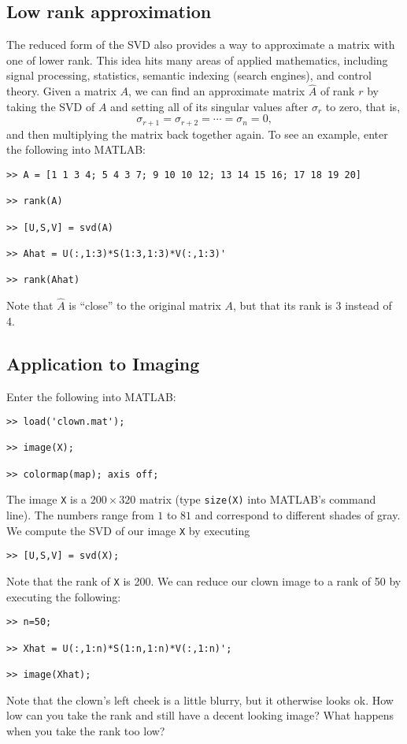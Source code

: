 \subsection{Low rank approximation}

The reduced form of the SVD also provides a way to approximate a
matrix with one of lower rank. This idea hits many areas of applied
mathematics, including signal processing, statistics, semantic
indexing (search engines), and control theory.  Given a matrix $A$,
we can find an approximate matrix $\widehat A$ of rank $r$ by taking
the SVD of $A$ and setting all of its singular values after
$\sigma_r$ to zero, that is,
\[
\sigma_{r+1} = \sigma_{r+2} = \cdots = \sigma_n = 0,
\]
and then multiplying the matrix back together again.  To see an
example, enter the following into MATLAB:

\begin{verbatim}
>> A = [1 1 3 4; 5 4 3 7; 9 10 10 12; 13 14 15 16; 17 18 19 20]

>> rank(A)

>> [U,S,V] = svd(A)

>> Ahat = U(:,1:3)*S(1:3,1:3)*V(:,1:3)'

>> rank(Ahat)
\end{verbatim}
Note that $\widehat A$ is ``close'' to the original matrix $A$, but
that its rank is 3 instead of 4.

\subsection{Application to Imaging}

Enter the following into MATLAB:
\begin{verbatim}
>> load('clown.mat');

>> image(X);

>> colormap(map); axis off;
\end{verbatim}
The image {\tt X} is a $200\times 320$ matrix (type {\tt size(X)}
into MATLAB's command line).  The numbers range from $1$ to $81$ and
correspond to different shades of gray.  We compute the SVD of our
image {\tt X} by executing
\begin{verbatim}
>> [U,S,V] = svd(X);
\end{verbatim}
Note that the rank of {\tt X} is 200.  We can reduce our clown image
to a rank of 50 by executing the following:
\begin{verbatim}
>> n=50;

>> Xhat = U(:,1:n)*S(1:n,1:n)*V(:,1:n)';

>> image(Xhat);
\end{verbatim}
Note that the clown's left cheek is a little blurry, but it
otherwise looks ok.  How low can you take the rank and still have a
decent looking image?  What happens when you take the rank too low?

